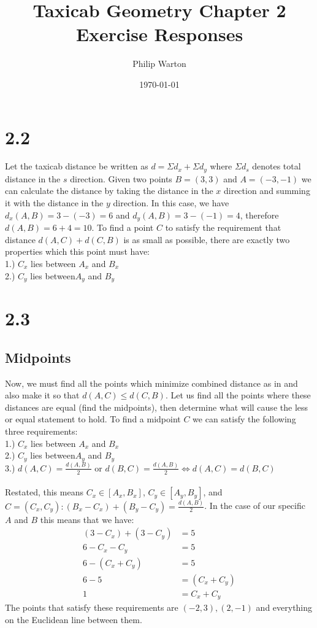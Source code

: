 \documentclass{article}
\begin{document}
\title{Taxicab Geometry Chapter 2 Exercise Responses}
\author{Philip Warton}
\date{\today}
\maketitle

\section*{2.2}
Let the taxicab distance be written as $d = \Sigma d_x + \Sigma d_y$ where $\Sigma d_s$ denotes total distance in the $s$ direction. Given two points $B = (3, 3)$ and $A = (-3, -1)$ we can calculate the distance by taking the distance in the $x$ direction and summing it with the distance in the $y$ direction. In this case, we have $d_x(A, B) = 3 - (-3) = 6$ and $d_y(A,B) = 3 - (-1) = 4$, therefore $d(A,B) = 6 + 4 = 10$. To find a point $C$ to satisfy the requirement that distance $d(A,C) + d(C,B)$ is as small as possible, there are exactly two properties which this point must have: \\
1.) $C_x$ lies between $A_x$ and $B_x$ \\
2.) $C_y$ lies between$A_y$ and $B_y$ \\
\section*{2.3}
\subsection*{Midpoints}
Now, we must find all the points which minimize combined distance as in  and also make it so that $d(A,C) \leqslant d(C,B)$. Let us find all the points where these distances are equal (find the midpoints), then determine what will cause the less or equal statement to hold. To find a midpoint $C$ we can satisfy the following three requirements: \\
1.) $C_x$ lies between $A_x$ and $B_x$ \\
2.) $C_y$ lies between$A_y$ and $B_y$ \\
3.) $d(A,C) = \frac{d(A,B)}{2}$ or $d(B,C) = \frac{d(A,B)}{2} \iff d(A,C) = d(B,C)$\\\\
Restated, this means $C_x \in [A_x, B_x]$, $C_y \in [A_y, B_y]$, and $C = (C_x, C_y) : (B_x - C_x) + (B_y - C_y) = \frac{d(A,B)}{2}$. In the case of our specific $A$ and $B$ this means that we have:
\begin{align*}
(3 - C_x) + (3 - C_y) & = 5 \\
6 - C_x - C_y & = 5 \\
6 - (C_x + C_y) & = 5 \\
6 - 5 & = (C_x + C_y) \\
1 & = C_x + C_y
\end{align*}
The points that satisfy these requirements are $(-2,3),(2,-1)$ and everything on the Euclidean line between them.
\end{document}
